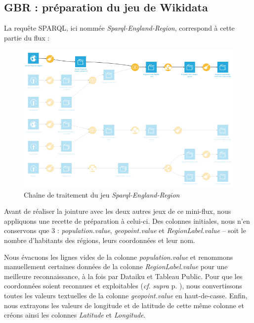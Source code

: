 \documentclass[hidelinks, 12pt]{report}
\begin{document}
%





\subsection{GBR : préparation du jeu de Wikidata}

La requête SPARQL, ici nommée \textit{Sparql-England-Region}, correspond à cette partie du flux :

\begin{center}
	\begin{figure}[H]
		\centering
		\setlength{\belowcaptionskip}{-35pt}
		\includegraphics[scale=0.5]{images/flow-swim-eng-sparql.png}
		\caption{Chaîne de traitement du jeu \textit{Sparql-England-Region}}
	\end{figure}
\end{center}

Avant de réaliser la jointure avec les deux autres jeux de ce mini-flux, nous appliquons une recette de préparation à celui-ci. Des colonnes initiales, nous n'en conservons que 3 : \textit{population.value}, \textit{geopoint.value} et \textit{RegionLabel.value} -- soit le nombre d'habitants des régions, leurs coordonnées et leur nom.

Nous évacuons les lignes vides de la colonne \textit{population.value} et renommons manuellement certaines données de la colonne \textit{RegionLabel.value} pour une meilleure reconnaissance, à la fois par Dataiku et Tableau Public. Pour que les coordonnées soient reconnues et exploitables (\textit{cf}. \textit{supra} p. \pageref{casse}), nous convertissons toutes les valeurs textuelles de la colonne \textit{geopoint.value} en haut-de-casse. Enfin, nous extrayons les valeurs de longitude et de latitude de cette même colonne et créons ainsi les colonnes \textit{Latitude} et \textit{Longitude}.
\end{document}
